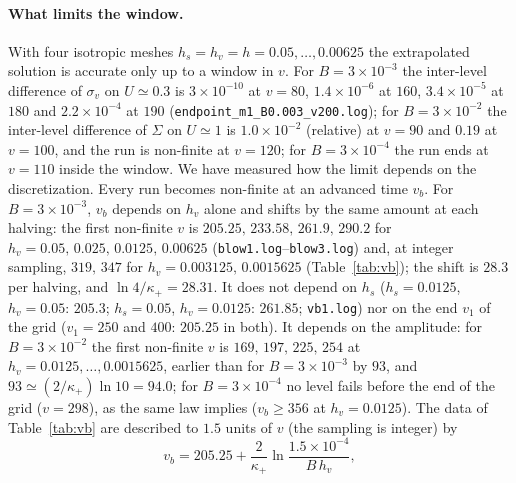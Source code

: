 \documentclass[11pt]{article}
\begin{document}
\paragraph{What limits the window.} With four isotropic meshes $h_s=h_v=h=0.05,\ldots,0.00625$ the extrapolated solution is accurate only up to a window in $v$. For $B=3\times10^{-3}$ the inter-level difference of $\sigma_v$ on $U\simeq0.3$ is $3\times10^{-10}$ at $v=80$, $1.4\times10^{-6}$ at $160$, $3.4\times10^{-5}$ at $180$ and $2.2\times10^{-4}$ at $190$ (\texttt{endpoint\_m1\_B0.003\_v200.log}); for $B=3\times10^{-2}$ the inter-level difference of $\Sigma$ on $U\simeq1$ is $1.0\times10^{-2}$ (relative) at $v=90$ and $0.19$ at $v=100$, and the run is non-finite at $v=120$; for $B=3\times10^{-4}$ the run ends at $v=110$ inside the window. We have measured how the limit depends on the discretization. Every run becomes non-finite at an advanced time $v_b$. For $B=3\times10^{-3}$, $v_b$ depends on $h_v$ alone and shifts by the same amount at each halving: the first non-finite $v$ is $205.25,\,233.58,\,261.9,\,290.2$ for $h_v=0.05,\,0.025,\,0.0125,\,0.00625$ (\texttt{blow1.log}--\texttt{blow3.log}) and, at integer sampling, $319,\,347$ for $h_v=0.003125,\,0.0015625$ (Table~\ref{tab:vb}); the shift is $28.3$ per halving, and $\ln4/\kappa_+=28.31$. It does not depend on $h_s$ ($h_s=0.0125$, $h_v=0.05$: $205.3$; $h_s=0.05$, $h_v=0.0125$: $261.85$; \texttt{vb1.log}) nor on the end $v_1$ of the grid ($v_1=250$ and $400$: $205.25$ in both). It depends on the amplitude: for $B=3\times10^{-2}$ the first non-finite $v$ is $169,\,197,\,225,\,254$ at $h_v=0.0125,\ldots,0.0015625$, earlier than for $B=3\times10^{-3}$ by $93$, and $93\simeq(2/\kappa_+)\ln10=94.0$; for $B=3\times10^{-4}$ no level fails before the end of the grid ($v=298$), as the same law implies ($v_b\ge356$ at $h_v=0.0125$). The data of Table~\ref{tab:vb} are described to $1.5$ units of $v$ (the sampling is integer) by
\begin{equation}
v_b=205.25+\frac{2}{\kappa_+}\ln\frac{1.5\times10^{-4}}{B\,h_v},
\label{eq:vb}
\end{equation}
\end{document}
